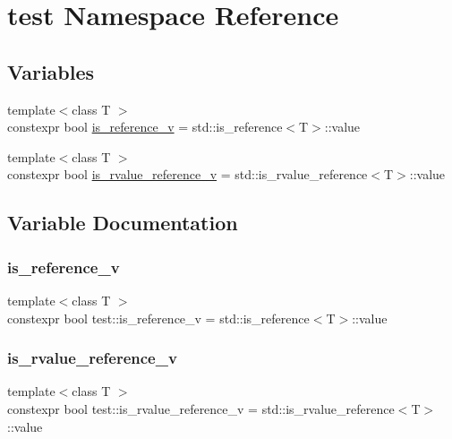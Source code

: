\hypertarget{namespacetest}{}\section{test Namespace Reference}
\label{namespacetest}
\subsection*{Variables}
\begin{DoxyCompactItemize}
\item 
{\footnotesize template$<$class T $>$ }\\constexpr bool \mbox{\hyperlink{namespacetest_a463d61708cea9480e55ee03141e2b951}{is\+\_\+reference\+\_\+v}} = std\+::is\+\_\+reference$<$T$>$\+::value
\item 
{\footnotesize template$<$class T $>$ }\\constexpr bool \mbox{\hyperlink{namespacetest_a79cef7fd7cce0d4c7a466bcc871dca48}{is\+\_\+rvalue\+\_\+reference\+\_\+v}} = std\+::is\+\_\+rvalue\+\_\+reference$<$T$>$\+::value
\end{DoxyCompactItemize}


\subsection{Variable Documentation}
\mbox{\label{namespacetest_a463d61708cea9480e55ee03141e2b951}} 
\subsubsection{\texorpdfstring{is\_reference\_v}{is\_reference\_v}}
{\footnotesize\ttfamily template$<$class T $>$ \\
constexpr bool test\+::is\+\_\+reference\+\_\+v = std\+::is\+\_\+reference$<$T$>$\+::value}

\mbox{\label{namespacetest_a79cef7fd7cce0d4c7a466bcc871dca48}} 
\subsubsection{\texorpdfstring{is\_rvalue\_reference\_v}{is\_rvalue\_reference\_v}}
{\footnotesize\ttfamily template$<$class T $>$ \\
constexpr bool test\+::is\+\_\+rvalue\+\_\+reference\+\_\+v = std\+::is\+\_\+rvalue\+\_\+reference$<$T$>$\+::value}

